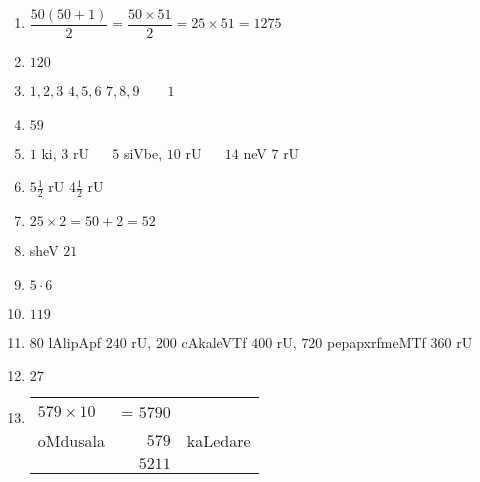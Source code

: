 \begin{enumerate}
\item $\dfrac{50(50+1)}{2} = \dfrac{50 \times 51}{2} = 25 \times 51 = 1275$
  
\item $120$

\item $1 , 2, 3$ \qquad $4,5,6$ \qquad $7 , 8,9 \qquad 1$

\item $59$

\item $1$ ki, $3$ rU ~~ $5$ siVbe, $10$ rU ~~ $14$ neV $7$ rU

\item $5 \frac{1}{2}$ rU $4\frac{1}{2}$ rU

\item $25 \times 2 = 50 +2 = 52$

\item sheV $21$

\item $5 \cdot 6$
  
\item $119$


\item $80$ lAlipApf $240$ rU, $200$ cAkaleVTf $400$ rU, $720$  pepapxrfmeMTf $360$ rU

\item $27$

\item
  \qquad \begin{tabular}[t]{lrl}
    $579 \times 10$ & = $5790$ & \\
    oMdusala & $579$ & kaLedare \\\cline{2-2}
    & $5211$ &
  \end{tabular}

\end{enumerate}
